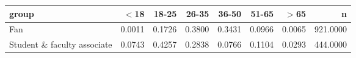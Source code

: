 \begin{tabular}{lrrrrrrr}
  \hline
group & $<$18 & 18-25 & 26-35 & 36-50 & 51-65 & $>$65 & n \\ 
  \hline
Fan & 0.0011 & 0.1726 & 0.3800 & 0.3431 & 0.0966 & 0.0065 & 921.0000 \\ 
  Student \& faculty associate & 0.0743 & 0.4257 & 0.2838 & 0.0766 & 0.1104 & 0.0293 & 444.0000 \\ 
   \hline
\end{tabular}
